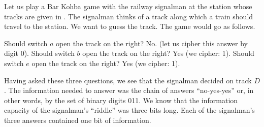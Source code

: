 Let us play a Bar Kohba game with the railway signalman at the
station whose tracks are given in . The signalman thinks of a track along which a train should travel to the station. We want to
guess the track. The game would go as follows.
\begin{dialogue}
\ques Should switch $a$ open the track on the right?
\ans No. (let us cipher this answer by digit 0).
\ques Should switch $b$ open the track on the right?
\ans Yes (we cipher: 1). 
\ques Should switch $e$ open the track on the right? 
\ans Yes (we cipher: 1).
\end{dialogue}
Having asked these three questions, we see that the signalman decided
on track $D$. The information needed to answer was the chain of answers
``no-yes-yes'' or, in other words, by the set of binary digits 011. We
know that the information capacity of the signalman's ``riddle'' was three
bits long. Each of the signalman's three answers contained one bit of
information.

